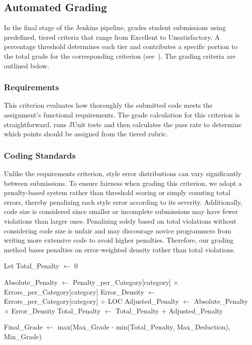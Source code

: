 \subsection{Automated Grading}
In the final stage of the Jenkins pipeline, \codeinspector grades student submissions using predefined, tiered criteria that range from Excellent to Unsatisfactory. A percentage threshold determines each tier and contributes a specific portion to the total grade for the corresponding criterion (see~\cite{10590588}). The grading criteria are outlined below.

\subsubsection{Requirements} This criterion evaluates how thoroughly the submitted code meets the assignment's functional requirements. The grade calculation for this criterion is straightforward. \codeinspector runs JUnit tests and then calculates the pass rate to determine which points should be assigned from the tiered rubric.

\subsubsection{Coding Standards}
Unlike the requirements criterion, style error distributions can vary significantly between submissions. To ensure fairness when grading this criterion, we adopt a penalty-based system rather than threshold scoring or simply counting total errors, thereby penalizing each style error according to its severity. Additionally, code size is considered since smaller or incomplete submissions may have fewer violations than larger ones. Penalizing solely based on total violations without considering code size is unfair and may discourage novice programmers from writing more extensive code to avoid higher penalties. Therefore, our grading method bases penalties on error-weighted density rather than total violations.

\begin{algorithm}[tbp]
        \fontsize{8pt}{8pt}\selectfont
        \SetAlgoLined
              Let Total\_Penalty $\leftarrow$ 0\;
                     
              {
              Absolute\_Penalty $\gets$ Penalty\_per\_Category[category] $\times$ Errors\_per\_Category[category]\;
              Error\_Density $\gets$ Errors\_per\_Category[category] $\div$ {LOC}\;
              Adjusted\_Penalty $\gets$ Absolute\_Penalty $\times$ Error\_Density\;
              Total\_Penalty $\gets$ Total\_Penalty + Adjusted\_Penalty\;
              }

              Final\_Grade $\gets$ max(Max\_Grade - min(Total\_Penalty, Max\_Deduction), Min\_Grade)\;
        \;
        \caption{Error-weighted density grading.}
        \label{algo1}
\end{algorithm}

